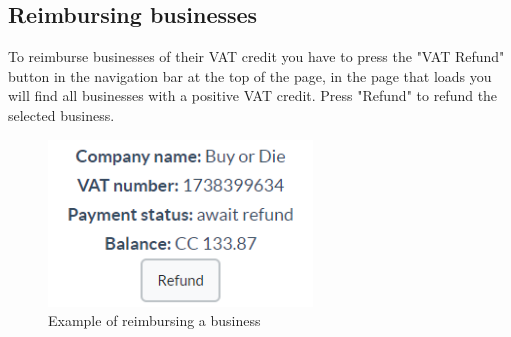 	\subsection{Reimbursing businesses}
	To reimburse businesses of their VAT credit you have to press the "VAT 
	Refund" button in the navigation bar at the top of the page, in the 
	page that loads you will find all businesses with a positive VAT credit.
	Press "Refund" to refund the selected business.
	\begin{figure}[H]
		\includegraphics[width=7cm]{res/images/business_refund.png}
		\centering
		\caption{Example of reimbursing a business}
	\end{figure}